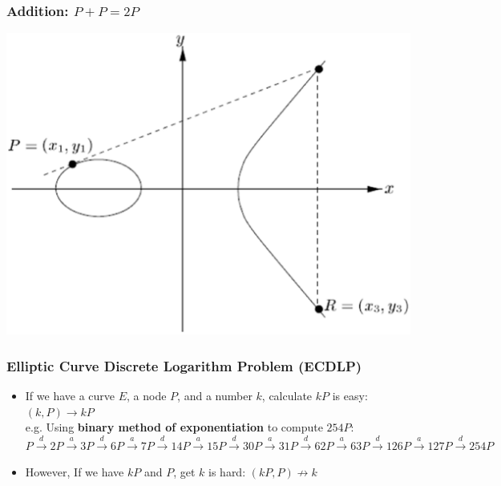 \documentclass{beamer}
\begin{document}
  \begin{frame}
  	\frametitle{Addition: $P + P = 2P$}
  	\includegraphics[scale=0.3]{2p.eps}
  \end{frame}
  
  \begin{frame}
  	\frametitle{Elliptic Curve Discrete Logarithm Problem (ECDLP)}
  	\begin{itemize}
		\item If we have a curve $E$, a node $P$, and a number $k$, calculate $kP$ is easy: $(k, P) \rightarrow kP$\\
  		e.g. Using \textbf{binary method of exponentiation} to compute $254P$:\\
  		$P\xrightarrow{d}2P\xrightarrow{a}3P
  		\xrightarrow{d}6P\xrightarrow{a}7P
  		\xrightarrow{d}14P\xrightarrow{a}15P
  		\xrightarrow{d}30P\xrightarrow{a}31P
  		\xrightarrow{d}62P\xrightarrow{a}63P
  		\xrightarrow{d}126P\xrightarrow{a}127P
  		\xrightarrow{d}254P$\\
  		\item However, If we have $kP$ and $P$, get $k$ is \alert{hard}: $(kP, P) \not\rightarrow k$
  	\end{itemize}
  \end{frame}
  
\end{document}
